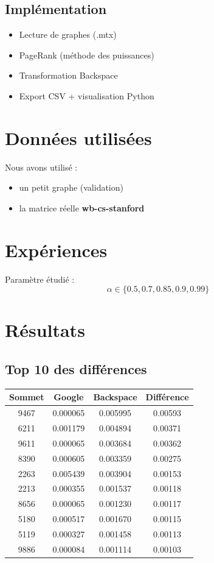 \documentclass[a4paper,11pt]{article}
\begin{document}
\subsection{Implémentation}

\begin{itemize}
    \item Lecture de graphes (.mtx)
    \item PageRank (méthode des puissances)
    \item Transformation Backspace
    \item Export CSV + visualisation Python
\end{itemize}

\section{Données utilisées}

Nous avons utilisé :
\begin{itemize}
    \item un petit graphe (validation)
    \item la matrice réelle \textbf{wb-cs-stanford}
\end{itemize}

\section{Expériences}

Paramètre étudié :
\[
\alpha \in \{0.5, 0.7, 0.85, 0.9, 0.99\}
\]

\section{Résultats}

\subsection{Top 10 des différences}

\begin{center}
\begin{tabular}{cccc}
\toprule
Sommet & Google & Backspace & Différence \\
\midrule
9467 & 0.000065 & 0.005995 & 0.00593 \\
6211 & 0.001179 & 0.004894 & 0.00371 \\
9611 & 0.000065 & 0.003684 & 0.00362 \\
8390 & 0.000605 & 0.003359 & 0.00275 \\
2263 & 0.005439 & 0.003904 & 0.00153 \\
2213 & 0.000355 & 0.001537 & 0.00118 \\
8656 & 0.000065 & 0.001230 & 0.00117 \\
5180 & 0.000517 & 0.001670 & 0.00115 \\
5119 & 0.000327 & 0.001458 & 0.00113 \\
9886 & 0.000084 & 0.001114 & 0.00103 \\
\bottomrule
\end{tabular}
\end{center}
\end{document}
